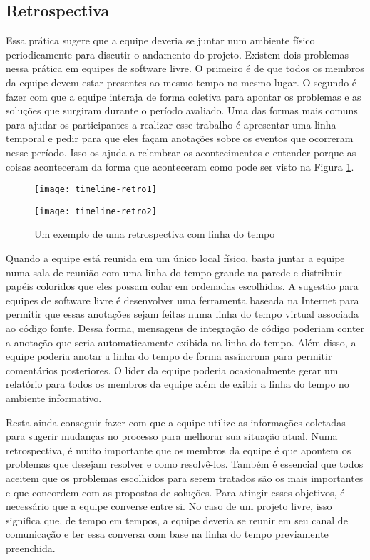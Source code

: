 \subsection{Retrospectiva}
\label{subsec:retrospect}

Essa prática sugere que a equipe deveria se juntar num ambiente físico
periodicamente para discutir o andamento do projeto. Existem dois
problemas nessa prática em equipes de software livre. O primeiro é de
que todos os membros da equipe devem estar presentes ao mesmo tempo no
mesmo lugar. O segundo é fazer com que a equipe interaja de forma
coletiva para apontar os problemas e as soluções que surgiram durante
o período avaliado. Uma das formas mais comuns para ajudar os
participantes a realizar esse trabalho é apresentar uma linha temporal
e pedir para que eles façam anotações sobre os eventos que ocorreram
nesse período. Isso os ajuda a relembrar os acontecimentos e entender
porque as coisas aconteceram da forma que aconteceram como pode ser
visto na Figura \ref{fig:timelineretro}.

\begin{figure}[htb]
  \begin{minipage}[t]{0.5\linewidth}
    \centering
    \texttt{[image: timeline-retro1]}
  \end{minipage}
  \begin{minipage}[t]{0.5\linewidth}
    \centering
    \texttt{[image: timeline-retro2]}
  \end{minipage}
  \caption{Um exemplo de uma retrospectiva com linha do tempo}
  \label{fig:timelineretro}
\end{figure}

Quando a equipe está reunida em um único local físico, basta juntar a
equipe numa sala de reunião com uma linha do tempo grande na parede e
distribuir papéis coloridos que eles possam colar em ordenadas
escolhidas. A sugestão para equipes de software livre é desenvolver
uma ferramenta baseada na Internet para permitir que essas anotações
sejam feitas numa linha do tempo virtual associada ao código
fonte. Dessa forma, mensagens de integração de código poderiam conter
a anotação que seria automaticamente exibida na linha do tempo. Além
disso, a equipe poderia anotar a linha do tempo de forma assíncrona
para permitir comentários posteriores. O líder da equipe poderia
ocasionalmente gerar um relatório para todos os membros da equipe além
de exibir a linha do tempo no ambiente informativo.

Resta ainda conseguir fazer com que a equipe utilize as informações
coletadas para sugerir mudanças no processo para melhorar sua situação
atual. Numa retrospectiva, é muito importante que os membros da equipe
é que apontem os problemas que desejam resolver e como
resolvê-los. Também é essencial que todos aceitem que os problemas
escolhidos para serem tratados são os mais importantes e que concordem
com as propostas de soluções. Para atingir esses objetivos, é
necessário que a equipe converse entre si. No caso de um projeto
livre, isso significa que, de tempo em tempos, a equipe deveria se
reunir em seu canal de comunicação e ter essa conversa com base na
linha do tempo previamente preenchida.

